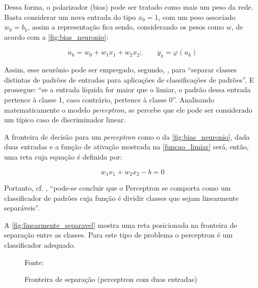 Dessa forma, o polarizador (bias) pode ser tratado como mais um peso da rede. Basta considerar um nova entrada do tipo $x_0 = 1$, com um peso associado $w_0 = b_k$, assim a representação fica sendo, considerando os pesos como $w$, de acordo com a \autoref{fig:bias_neuronio}:

\begin{equation}
	u_k = w_0 + w_1x_1 + w_2x_2; \qquad y_k = \varphi(u_k)
\end{equation}

Assim, esse neurônio pode ser empregado, segundo, , para ``separar classes distintas de padrões de entradas para aplicações de classificações de padrões''. E prossegue: ``se a entrada líquida for maior que o limiar, o padrão dessa entrada pertence à classe 1, caso contrário, pertence à classe 0''. Analisando matematicamente o modelo \textit{perceptron}, se percebe que ele pode ser considerado um típico caso de discriminador linear. 

A fronteira de decisão para um \textit{perceptron} como o da \autoref{fig:bias_neuronio}, dada duas entradas e a função de ativação mostrada na \autoref{funcao_limiar} será, então, uma reta cuja equação é definida por: 

\begin{equation}\label{eq_reta}
	w_1x_1 + w_2x_2 - b = 0
\end{equation}

Portanto, cf. , ``pode-se concluir que o Perceptron se comporta como um classificador de padrões cuja função é dividir classes que sejam linearmente separáveis''.

A \autoref{fig:linearmente_separavel} mostra uma reta posicionada na fronteira de separação entre as classes. Para este tipo de problema o perceptron é um classificador adequado.

\begin{figure}[h!]
	\centering
	\caption{Fronteira de separação (perceptron com duas entradas)}

	{\scriptsize 	Fonte: }
	\label{fig:linearmente_separavel}
\end{figure}

